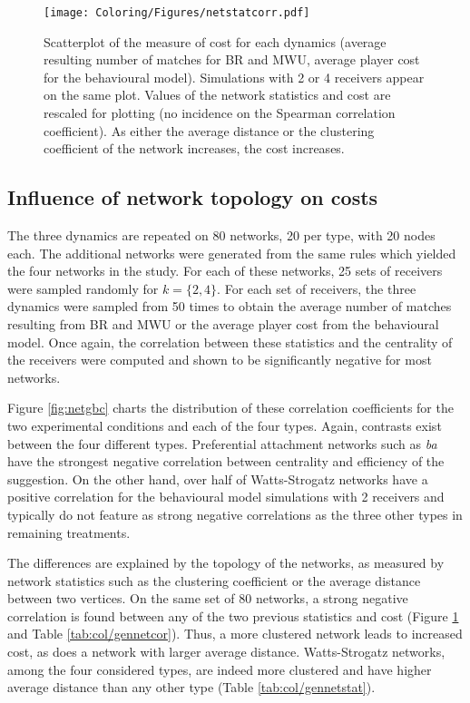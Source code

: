 
\begin{figure}
  \centering
  \texttt{[image: Coloring/Figures/netstatcorr.pdf]}
  \caption{Scatterplot of the measure of cost for each dynamics (average resulting number of matches for BR and MWU, average player cost for the behavioural model). Simulations with 2 or 4 receivers appear on the same plot. Values of the network statistics and cost are rescaled for plotting (no incidence on the Spearman correlation coefficient). As either the average distance or the clustering coefficient of the network increases, the cost increases.}
	\label{fig:netstatcorr}
\end{figure}

\subsection{Influence of network topology on costs}
The three dynamics are repeated on 80 networks, 20 per type, with 20 nodes each. The additional networks were generated from the same rules which yielded the four networks in the study. For each of these networks, 25 sets of receivers were sampled randomly for \( k = \{2, 4\} \). For each set of receivers, the three dynamics were sampled from 50 times to obtain the average number of matches resulting from BR and MWU or the average player cost from the behavioural model. Once again, the correlation between these statistics and the centrality of the receivers were computed and shown to be significantly negative for most networks.

Figure \ref{fig:netgbc} charts the distribution of these correlation coefficients for the two experimental conditions and each of the four types. Again, contrasts exist between the four different types. Preferential attachment networks such as \textit{ba} have the strongest negative correlation between centrality and efficiency of the suggestion. On the other hand, over half of Watts-Strogatz networks have a positive correlation for the behavioural model simulations with 2 receivers and typically do not feature as strong negative correlations as the three other types in remaining treatments.

The differences are explained by the topology of the networks, as measured by network statistics such as the clustering coefficient or the average distance between two vertices. On the same set of 80 networks, a strong negative correlation is found between any of the two previous statistics and cost (Figure \ref{fig:netstatcorr} and Table \ref{tab:col/gennetcor}). Thus, a more clustered network leads to increased cost, as does a network with larger average distance. Watts-Strogatz networks, among the four considered types, are indeed more clustered and have higher average distance than any other type (Table \ref{tab:col/gennetstat}).

